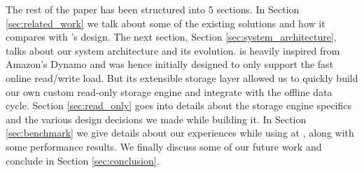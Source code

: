 The rest of the paper has been structured into 5 sections. In Section \ref{sec:related_work} we talk about some of the existing solutions and how it compares with \projectname{}'s design. The next section, Section \ref{sec:system_architecture},  talks about our system architecture and its evolution. \projectname{} is heavily inspired from Amazon's Dynamo\cite{dynamo} and was hence initially designed to only support the fast online read/write load. But its extensible storage layer allowed us to quickly build our own custom read-only storage engine and integrate with the offline data cycle. Section \ref{sec:read_only} goes into details about the storage engine specifics and the various design decisions we made while building it. In Section \ref{sec:benchmark} we give details about our experiences while using \projectname{} at \linkedin{}, along with some performance results. We finally discuss some of our future work and conclude in Section \ref{sec:conclusion}.